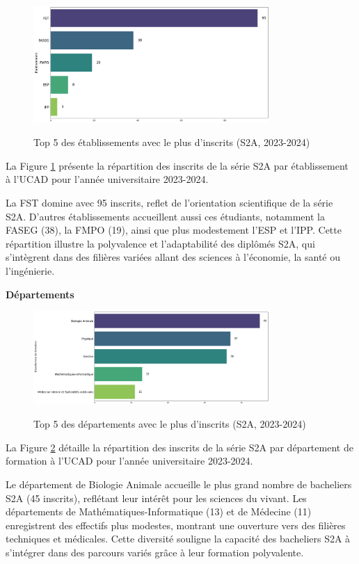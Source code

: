 \begin{figure}[ht]
\centering
\caption{Top 5 des établissements avec le plus d'inscrits (S2A, 2023-2024)}
\includegraphics[width=0.8\textwidth]{figure/etab_S2A_2024.png}
\label{fig:etab_s2a_2024}
\end{figure}

La Figure \ref{fig:etab_s2a_2024} présente la répartition des inscrits de la série S2A par établissement à l'UCAD pour l'année universitaire 2023-2024.

La FST domine avec 95 inscrits, reflet de l’orientation scientifique de la série S2A. 
D’autres établissements accueillent aussi ces étudiants, notamment la FASEG (38), la FMPO (19), ainsi que plus modestement l’ESP et l’IPP. Cette répartition illustre la polyvalence et l’adaptabilité des diplômés S2A, qui s’intègrent dans des filières variées allant des sciences à l’économie, la santé ou l’ingénierie.

\textbf{Départements}

\begin{figure}[ht]
\centering
\caption{Top 5 des départements avec le plus d'inscrits (S2A, 2023-2024)}
\includegraphics[width=0.8\textwidth]{figure/dep_S2A_2024.png}
\label{fig:dep_s2a_2024}
\end{figure}

La Figure \ref{fig:dep_s2a_2024} détaille la répartition des inscrits de la série S2A par département de formation à l'UCAD pour l'année universitaire 2023-2024.

Le département de Biologie Animale accueille le plus grand nombre de bacheliers S2A (45 inscrits), reflétant leur intérêt pour les sciences du vivant. 
Les départements de Mathématiques-Informatique (13) et de Médecine (11) enregistrent des effectifs plus modestes, montrant une ouverture vers des filières techniques et médicales. 
Cette diversité souligne la capacité des bacheliers S2A à s’intégrer dans des parcours variés grâce à leur formation polyvalente.

